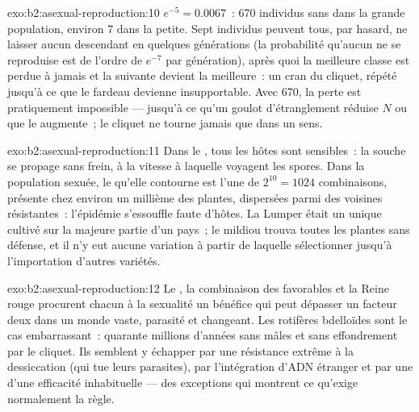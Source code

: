 \begin{solution}{exo:b2:asexual-reproduction:10}
$e^{-5} = 0.0067$~: 670 individus sans  dans la grande
population, environ 7 dans la petite. Sept individus peuvent tous, par
hasard, ne laisser aucun descendant en quelques générations (la
probabilité qu'aucun ne se reproduise est de l'ordre de $e^{-7}$ par
génération), après quoi la meilleure classe est perdue à jamais et la
suivante devient la meilleure~: un cran du cliquet, répété jusqu'à ce
que le fardeau devienne insupportable. Avec 670, la perte est
pratiquement impossible --- jusqu'à ce qu'un goulot d'étranglement
réduise $N$ ou que le  augmente~; le cliquet ne tourne
jamais que dans un sens.
\end{solution}

\begin{solution}{exo:b2:asexual-reproduction:11}
Dans le , tous les hôtes sont sensibles~: la souche se propage sans
frein, à la vitesse à laquelle voyagent les spores. Dans la population
sexuée, le  qu'elle contourne est l'une de $2^{10} = 1024$
combinaisons, présente chez environ un millième des plantes, dispersées
parmi des voisines résistantes~: l'épidémie s'essouffle faute d'hôtes.
La Lumper était un  unique cultivé sur la majeure partie d'un
pays~; le mildiou trouva toutes les plantes sans défense, et il n'y eut
aucune variation à partir de laquelle sélectionner jusqu'à l'importation
d'autres variétés.
\end{solution}

\begin{solution}{exo:b2:asexual-reproduction:12}
Le , la combinaison des  favorables et la
Reine rouge procurent chacun à la sexualité un bénéfice qui peut
dépasser un facteur deux dans un monde vaste, parasité et changeant. Les
rotifères bdelloïdes sont le cas embarrassant~: quarante millions
d'années sans mâles et sans effondrement par le cliquet. Ils semblent y
échapper par une résistance extrême à la dessiccation (qui tue leurs
parasites), par l'intégration d'ADN étranger et par une  d'une efficacité inhabituelle --- des exceptions qui montrent ce
qu'exige normalement la règle.
\end{solution}

